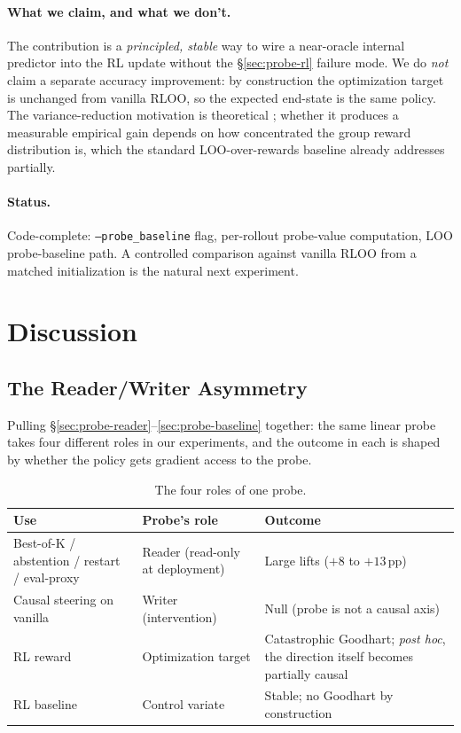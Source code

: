 \documentclass[11pt]{article}
\begin{document}
\paragraph{What we claim, and what we don't.} The contribution is a \emph{principled, stable} way to wire a near-oracle internal predictor into the RL update without the §\ref{sec:probe-rl} failure mode. We do \emph{not} claim a separate accuracy improvement: by construction the optimization target is unchanged from vanilla RLOO, so the expected end-state is the same policy. The variance-reduction motivation is theoretical \citep{williams1992simple}; whether it produces a measurable empirical gain depends on how concentrated the group reward distribution is, which the standard LOO-over-rewards baseline already addresses partially.

\paragraph{Status.} Code-complete: \texttt{--probe\_baseline} flag, per-rollout probe-value computation, LOO probe-baseline path. A controlled comparison against vanilla RLOO from a matched initialization is the natural next experiment.

\section{Discussion}

\subsection{The Reader/Writer Asymmetry}

Pulling §\ref{sec:probe-reader}--\ref{sec:probe-baseline} together: the same linear probe takes four different roles in our experiments, and the outcome in each is shaped by whether the policy gets gradient access to the probe.

\begin{table}[h]
\centering
\small
\begin{tabular}{p{4.3cm}p{4.3cm}p{4.6cm}}
\toprule
Use & Probe's role & Outcome \\
\midrule
Best-of-K / abstention / restart / eval-proxy & Reader (read-only at deployment) & Large lifts ($+8$ to $+13$\,pp) \\
Causal steering on vanilla & Writer (intervention) & Null (probe is not a causal axis) \\
RL reward & Optimization target & Catastrophic Goodhart; \emph{post hoc}, the direction itself becomes partially causal \\
RL baseline & Control variate & Stable; no Goodhart by construction \\
\bottomrule
\end{tabular}
\caption{The four roles of one probe.}
\end{table}
\end{document}
